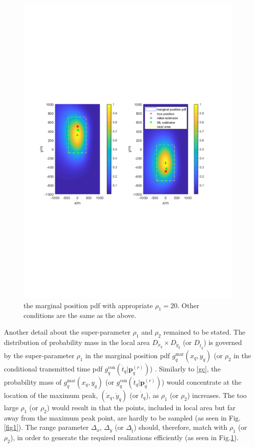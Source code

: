 \documentclass[review]{elsarticle}
\begin{document}
\begin{figure}[!t]
    \centerline{\includegraphics[width=1\textwidth]{pdfFigures/appropriate_rho1=20.pdf}}
    \centering
	\caption{the marginal position pdf with appropriate $\rho_1=20$. Other conditions are the same as the above.}\label{fig2}
\end{figure}

Another detail about the super-parameter $\rho_1$ and $\rho_2$ remained to be stated. The distribution of probability mass in the local area $D_{\mathring{x}_q}\times D_{\mathring{y}_q}$ (or $D_{\mathring{t}_q}$) is governed by the super-parameter $\rho_1$ in the marginal position pdf $g_{q}^{\text{mar}}(x_q,y_q)$ (or $\rho_2$ in the conditional transmitted time pdf $g_{q}^{\text{con}}(\mathring{t}_q\vert \boldsymbol{p}_q^{(r)})$) . Similarly to \eqref{gc}, the probability mass of $g_{q}^{\text{mar}}(x_q,y_q)$ (or $g_{q}^{\text{con}}(\mathring{t}_q\vert \boldsymbol{p}_q^{(r)})$) would concentrate at the location of the maximum peak, $(\mathring{x}_q,\mathring{y}_q)$ (or $\mathring{t}_q$), as $\rho_1$ (or $\rho_2$) increases. The too large $\rho_1$ (or $\rho_2$) would result in that the points, included in local area but far away from the maximum peak point, are hardly to be sampled (as seen in Fig.\ref{fig1}). The range parameter $\Delta_x$, $\Delta_y$ (or $\Delta_{\mathring{t}}$) should, therefore, match with $\rho_1$ (or $\rho_2$), in order to generate the required realizations efficiently (as seen in Fig.\ref{fig2}). 
\end{document}
